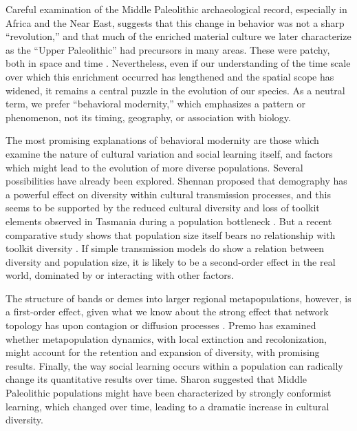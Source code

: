 \documentclass[graybox,natbib]{svmult}
\begin{document}
Careful examination of the Middle Paleolithic archaeological record,
especially in Africa and the Near East, suggests that this change in
behavior was not a sharp ``revolution,'' and that much of the enriched
material culture we later characterize as the ``Upper Paleolithic'' had
precursors in many areas. These were patchy, both in space and time
\citep{bouzouggar200782, d2007additional, d2011evolution, guy2005mosaic, mcbrearty2000revolution, mcbrearty2007down}.
Nevertheless, even if our understanding of the time scale over which
this enrichment occurred has lengthened and the spatial scope has
widened, it remains a central puzzle in the evolution of our species. As
a neutral term, we prefer ``behavioral modernity,'' which emphasizes a
pattern or phenomenon, not its timing, geography, or association with
biology.

The most promising explanations of behavioral modernity are those which
examine the nature of cultural variation and social learning itself, and
factors which might lead to the evolution of more diverse populations.
Several possibilities have already been explored. Shennan
\citetext{\citeyear{shennan2000population}; \citeyear{shennan2001demography}}
proposed that demography has a powerful effect on diversity within
cultural transmission processes, and this seems to be supported by the
reduced cultural diversity and loss of toolkit elements observed in
Tasmania during a population bottleneck \citep{henrich2004}. But a
recent comparative study shows that population size itself bears no
relationship with toolkit diversity \citep{collard2013risk}. If simple
transmission models do show a relation between diversity and population
size, it is likely to be a second-order effect in the real world,
dominated by or interacting with other factors.

The structure of bands or demes into larger regional metapopulations,
however, is a first-order effect, given what we know about the strong
effect that network topology has upon contagion or diffusion processes
\citep[e.g.,][]{castellano2009statistical, smilkov2012influence}. Premo
\citeyearpar{premo2012local} has examined whether metapopulation
dynamics, with local extinction and recolonization, might account for
the retention and expansion of diversity, with promising results.
Finally, the way social learning occurs within a population can
radically change its quantitative results over time. Sharon
\citeyearpar{sharon2009acheulian} suggested that Middle Paleolithic
populations might have been characterized by strongly conformist
learning, which changed over time, leading to a dramatic increase in
cultural diversity.
\end{document}
